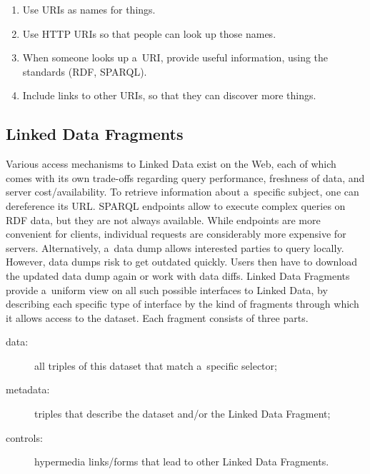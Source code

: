 \documentclass[runningheads,a4paper]{llncs}
\begin{document}
\begin{enumerate}
	\item Use URIs as names for things.
	\item Use HTTP URIs so that people can look up those names.
	\item When someone looks up a~URI, provide useful information, using the standards (RDF, SPARQL).
	\item Include links to other URIs, so that they can discover more things.
\end{enumerate}


\subsection{Linked Data Fragments}
Various access mechanisms to Linked Data exist on the Web,
each of which comes with its own trade-offs regarding query performance, freshness of data,
and server cost/availability.
To retrieve information about a~specific subject, one can dereference its URL.
SPARQL endpoints allow to execute complex queries on RDF data,
but they are not always available.
While endpoints are more convenient for clients, individual requests
are considerably more expensive for servers.
Alternatively, a~data dump allows interested parties to query locally.
However, data dumps risk to get outdated quickly.
Users then have to download the updated data dump again
or work with data diffs.
Linked Data Fragments~\cite{verborgh2014ldf} provide a~uniform view
on all such possible interfaces to Linked Data,
by describing each specific type of interface by the kind of fragments through which
it allows access to the dataset.
Each fragment consists of three parts.

\begin{description}
	\item[data:] all triples of this dataset that match a~specific selector;
	\item[metadata:] triples that describe the dataset and/or the Linked Data Fragment;
	\item[controls:] hypermedia links/forms that lead to other Linked Data Fragments.
\end{description}
\end{document}

